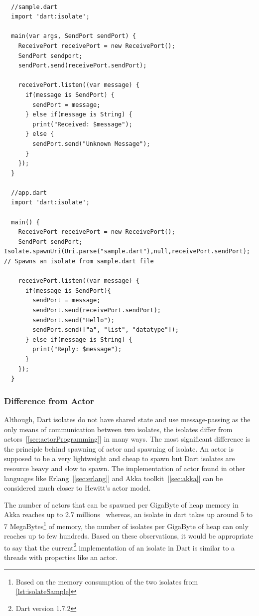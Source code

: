 \begin{lstlisting}[caption=A simple example of isolate communication in dart, label=lst:isolateSample]

  //sample.dart
  import 'dart:isolate';

  main(var args, SendPort sendPort) {
    ReceivePort receivePort = new ReceivePort();
    SendPort sendport;
    sendPort.send(receivePort.sendPort);

    receivePort.listen((var message) {
      if(message is SendPort) {
        sendPort = message;
      } else if(message is String) {
        print("Received: $message");
      } else {
        sendPort.send("Unknown Message");
      }
    });
  }

  //app.dart
  import 'dart:isolate';

  main() {
    ReceivePort receivePort = new ReceivePort();
    SendPort sendPort;  Isolate.spawnUri(Uri.parse("sample.dart"),null,receivePort.sendPort); // Spawns an isolate from sample.dart file

    receivePort.listen((var message) {
      if(message is SendPort){
        sendPort = message;
        sendPort.send(receivePort.sendPort);
        sendPort.send("Hello");
        sendPort.send(["a", "list", "datatype"]);
      } else if(message is String) {
        print("Reply: $message");
      }
    });
  }
\end{lstlisting}

  \subsubsection{Difference from Actor}
  Although, Dart isolates do not have shared state and use message-passing as the only means of communication between two isolates, the isolates differ from actors~[\autoref{sec:actorProgramming}] in many ways. The most significant difference is the principle behind spawning of actor and spawning of isolate. An actor is supposed to be a very lightweight and cheap to spawn but Dart isolates are resource heavy and slow to spawn. The implementation of actor found in other languages like Erlang~[\autoref{sec:erlang}] and Akka toolkit~[\autoref{sec:akka}] can be considered much closer to Hewitt's actor model.

  The number of actors that can be spawned per GigaByte of heap memory in Akka reaches up to 2.7 millions~\cite{akkaHome} whereas, an isolate in dart takes up around 5 to 7 MegaBytes\footnote{Based on the memory consumption of the two isolates from \autoref{lst:isolateSample}} of memory, the number of isolates per GigaByte of heap can only reaches up to few hundreds. Based on these observations, it would be appropriate to say that the current\footnote{Dart version 1.7.2} implementation of an isolate in Dart is \textemdash{} similar to a threads with properties like an actor.

